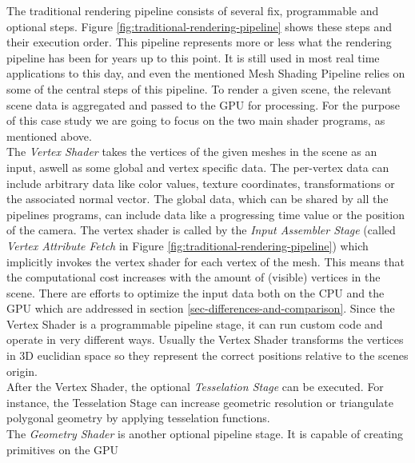 \noindent
The traditional rendering pipeline consists of several fix, programmable and optional steps.
Figure \ref{fig:traditional-rendering-pipeline} shows these steps and their execution order. 
This pipeline represents more or less what the rendering pipeline has been for years up to this point. 
It is still used in most real time applications to this day, and even the mentioned Mesh Shading 
Pipeline relies on some of the central steps of this pipeline. To render a given scene, the relevant 
scene data is aggregated and passed to the \ac{GPU} for processing. For the purpose of this case study 
we are going to focus on the two main shader programs, as mentioned above. \\


\noindent
The \emph{Vertex Shader} takes the vertices of the given meshes in the scene as an input, aswell as 
some global and vertex specific data. The per-vertex data can include arbitrary data like color values, 
texture coordinates, transformations or the associated normal vector. The global data, which can be shared
by all the pipelines programs, can include data like a progressing time value or the position of the camera.
The vertex shader is called by the \emph{Input Assembler Stage} (called \emph{Vertex Attribute Fetch} in 
Figure \ref{fig:traditional-rendering-pipeline}) which implicitly invokes the vertex shader for each vertex 
of the mesh. This means that the computational cost increases with the amount of (visible) vertices in the scene. 
There are efforts to optimize the input data both on the \ac{CPU} and the \ac{GPU} which are addressed in section 
\ref{sec-differences-and-comparison}. Since the Vertex Shader is a programmable pipeline stage, it can run  %
custom code and operate in very different ways. Usually the Vertex Shader transforms the vertices in 3D 
euclidian space so they represent the correct positions relative to the scenes origin. \\

\noindent
After the Vertex Shader, the optional \emph{Tesselation Stage} can be executed. 
For instance, the Tesselation Stage can increase geometric resolution or triangulate polygonal geometry by 
applying tesselation functions. \\

\noindent
The \emph{Geometry Shader} is another optional pipeline stage. It is capable of creating primitives on the GPU 




